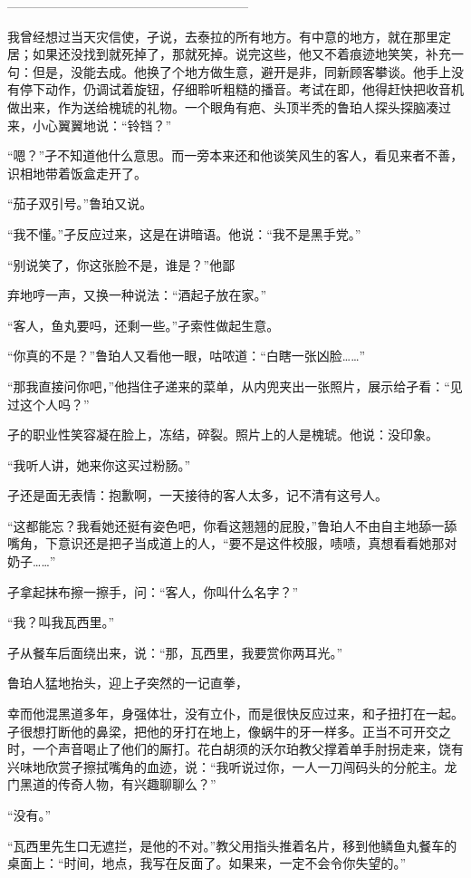 \documentclass{article}
\begin{document}
———————————————————

我曾经想过当天灾信使，孑说，去泰拉的所有地方。有中意的地方，就在那里定居；如果还没找到就死掉了，那就死掉。说完这些，他又不着痕迹地笑笑，补充一句：但是，没能去成。他换了个地方做生意，避开是非，同新顾客攀谈。他手上没有停下动作，仍调试着旋钮，仔细聆听粗糙的播音。考试在即，他得赶快把收音机做出来，作为送给槐琥的礼物。一个眼角有疤、头顶半秃的鲁珀人探头探脑凑过来，小心翼翼地说：“铃铛？”

“嗯？”孑不知道他什么意思。而一旁本来还和他谈笑风生的客人，看见来者不善，识相地带着饭盒走开了。

“茄子双引号。”鲁珀又说。

“我不懂。”孑反应过来，这是在讲暗语。他说：“我不是黑手党。”

“别说笑了，你这张脸不是，谁是？”他鄙

\newpage 

弃地哼一声，又换一种说法：“酒起子放在家。”

“客人，鱼丸要吗，还剩一些。”孑索性做起生意。

“你真的不是？”鲁珀人又看他一眼，咕哝道：“白瞎一张凶脸……”

“那我直接问你吧，”他挡住孑递来的菜单，从内兜夹出一张照片，展示给孑看：“见过这个人吗？”

孑的职业性笑容凝在脸上，冻结，碎裂。照片上的人是槐琥。他说：没印象。

“我听人讲，她来你这买过粉肠。”

孑还是面无表情：抱歉啊，一天接待的客人太多，记不清有这号人。

“这都能忘？我看她还挺有姿色吧，你看这翘翘的屁股，”鲁珀人不由自主地舔一舔嘴角，下意识还是把孑当成道上的人，“要不是这件校服，啧啧，真想看看她那对奶子……”

孑拿起抹布擦一擦手，问：“客人，你叫什么名字？”

“我？叫我瓦西里。”

孑从餐车后面绕出来，说：“那，瓦西里，我要赏你两耳光。”

鲁珀人猛地抬头，迎上孑突然的一记直拳，

\newpage 

幸而他混黑道多年，身强体壮，没有立仆，而是很快反应过来，和孑扭打在一起。孑很想打断他的鼻梁，把他的牙打在地上，像蜗牛的牙一样多。正当不可开交之时，一个声音喝止了他们的厮打。花白胡须的沃尔珀教父撑着单手肘拐走来，饶有兴味地欣赏孑擦拭嘴角的血迹，说：“我听说过你，一人一刀闯码头的分舵主。龙门黑道的传奇人物，有兴趣聊聊么？”

“没有。”

“瓦西里先生口无遮拦，是他的不对。”教父用指头推着名片，移到他鳞鱼丸餐车的桌面上：“时间，地点，我写在反面了。如果来，一定不会令你失望的。”
\end{document}

